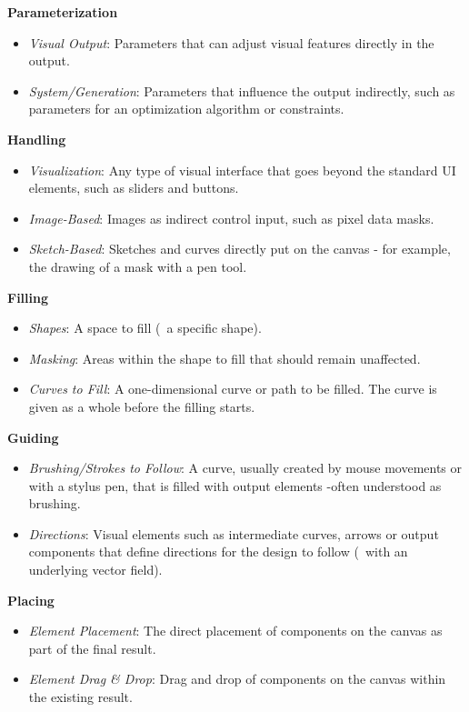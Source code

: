 \noindent\textbf{Parameterization}
\begin{itemize}
    \item \textit{Visual Output}: Parameters that can adjust visual features directly in the output.
    \item \textit{System/Generation}: Parameters that influence the output indirectly, such as parameters for an optimization algorithm or constraints.
\end{itemize}

\noindent\textbf{Handling}
\begin{itemize}
    \item \textit{Visualization}: Any type of visual interface that goes beyond the standard UI elements, such as sliders and buttons.
    \item \textit{Image-Based}: Images as indirect control input, such as pixel data masks.
    \item \textit{Sketch-Based}: Sketches and curves directly put on the canvas - for example, the drawing of a mask with a pen tool.
\end{itemize}

\noindent\textbf{Filling}
\begin{itemize}
    \item \textit{Shapes}: A space to fill (\eg~a specific shape).
    \item \textit{Masking}: Areas within the shape to fill that should remain unaffected.
    \item \textit{Curves to Fill}: A one-dimensional curve or path to be filled. The curve is given as a whole before the filling starts.
\end{itemize}

\noindent\textbf{Guiding}
\begin{itemize}
    \item \textit{Brushing/Strokes to Follow}: A curve, usually created by mouse movements or with a stylus pen, that is filled with output elements -often understood as brushing.
    \item \textit{Directions}: Visual elements such as intermediate curves, arrows or output components that define directions for the design to follow (\eg~with an underlying vector field).
\end{itemize}

\noindent\textbf{Placing}
\begin{itemize}
    \item \textit{Element Placement}: The direct placement of components on the canvas as part of the final result.
    \item \textit{Element Drag \& Drop}: Drag and drop of components on the canvas within the existing result.
\end{itemize}

